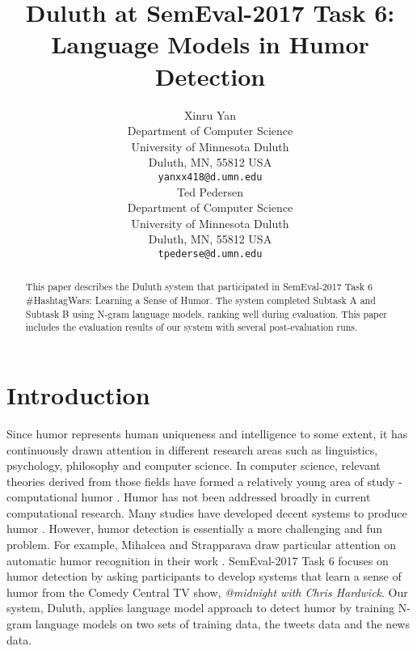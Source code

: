 \documentclass[11pt,a4paper]{article}
\title{Duluth at SemEval-2017 Task 6:  Language Models in Humor Detection}
\author{Xinru Yan \\
  Department of Computer Science \\ University of Minnesota Duluth \\ Duluth, MN, 55812 USA \\
  {\tt yanxx418@d.umn.edu} \\\And
  Ted Pedersen \\
  Department of Computer Science \\ University of Minnesota Duluth \\ Duluth, MN, 55812 USA \\
  {\tt tpederse@d.umn.edu} \\}
\date{}
\begin{document}
\maketitle
\begin{abstract}
  This paper describes the Duluth system that participated in SemEval-2017 Task 6 \#HashtagWars: Learning a Sense of Humor. The system completed Subtask A and Subtask B using N-gram language models, ranking well during evaluation. This paper includes the evaluation results of our system with several post-evaluation runs. 
\end{abstract}

\section{Introduction}
Since humor represents human uniqueness and intelligence to some extent, it has continuously drawn attention in different research areas such as linguistics, psychology, philosophy and computer science. In computer science, relevant theories derived from those fields have formed a relatively young area of study - computational humor \cite{Recognizing:Humor:On:Twitter}. Humor has not been addressed broadly in current computational research. Many studies have developed decent systems to produce humor \cite{ozbal2012computational}. However, humor detection is essentially a more challenging and fun problem. For example, Mihalcea and Strapparava draw particular attention on automatic humor recognition in their work \cite{Learning:To:Laugh}. SemEval-2017 Task 6 focuses on humor detection by asking participants to develop systems that learn a sense of humor from the Comedy Central TV show, \textit{@midnight with Chris Hardwick}. Our system, Duluth, applies language model approach to detect humor by training N-gram language models on two sets of training data, the tweets data and the news data.\\
\end{document}
